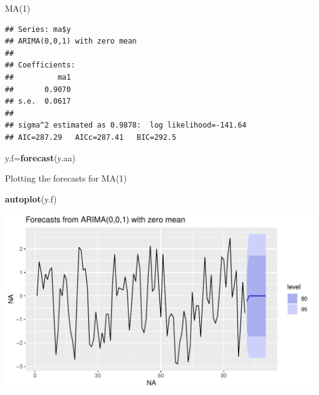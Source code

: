 \documentclass[ignorenonframetext,]{beamer}
\newenvironment{Shaded}{\begin{snugshade}}{\end{snugshade}}
\newcommand{\KeywordTok}[1]{\textcolor[rgb]{0.13,0.29,0.53}{\textbf{#1}}}
\newcommand{\NormalTok}[1]{#1}
\newcommand{\OperatorTok}[1]{\textcolor[rgb]{0.81,0.36,0.00}{\textbf{#1}}}
\begin{document}
\begin{frame}[fragile]{MA(1)}
\protect\hypertarget{ma1}{}

\begin{Shaded}
\end{Shaded}

\begin{verbatim}
## Series: ma$y 
## ARIMA(0,0,1) with zero mean 
## 
## Coefficients:
##          ma1
##       0.9070
## s.e.  0.0617
## 
## sigma^2 estimated as 0.9878:  log likelihood=-141.64
## AIC=287.29   AICc=287.41   BIC=292.5
\end{verbatim}

\begin{Shaded}
\begin{Highlighting}[]
\NormalTok{y.f=}\KeywordTok{forecast}\NormalTok{(y.aa)}
\end{Highlighting}
\end{Shaded}

\end{frame}

\begin{frame}[fragile]{Plotting the forecasts for MA(1)}
\protect\hypertarget{plotting-the-forecasts-for-ma1}{}

\begin{Shaded}
\begin{Highlighting}[]
\KeywordTok{autoplot}\NormalTok{(y.f)}
\end{Highlighting}
\end{Shaded}

\includegraphics{figure/unnamed-chunk-613-1.pdf}

\end{frame}
\end{document}
